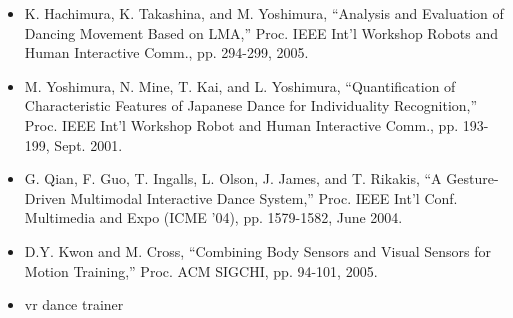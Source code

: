 \begin{itemize}
	\item K. Hachimura, K. Takashina, and M. Yoshimura, “Analysis and
	Evaluation of Dancing Movement Based on LMA,” Proc. IEEE Int’l
	Workshop Robots and Human Interactive Comm., pp. 294-299, 2005.
	\item M. Yoshimura, N. Mine, T. Kai, and L. Yoshimura, “Quantification	of Characteristic Features of Japanese Dance for Individuality Recognition,” Proc. IEEE Int’l Workshop Robot and Human Interactive Comm., pp. 193-199, Sept. 2001.
	\item G. Qian, F. Guo, T. Ingalls, L. Olson, J. James, and T. Rikakis, “A	Gesture-Driven Multimodal Interactive Dance System,” Proc. IEEE	Int’l Conf. Multimedia and Expo (ICME ’04), pp. 1579-1582, June	2004.
	\item D.Y. Kwon and M. Cross, “Combining Body Sensors and Visual
	Sensors for Motion Training,” Proc. ACM SIGCHI, pp. 94-101,	2005.
	\item vr dance trainer
\end{itemize}


